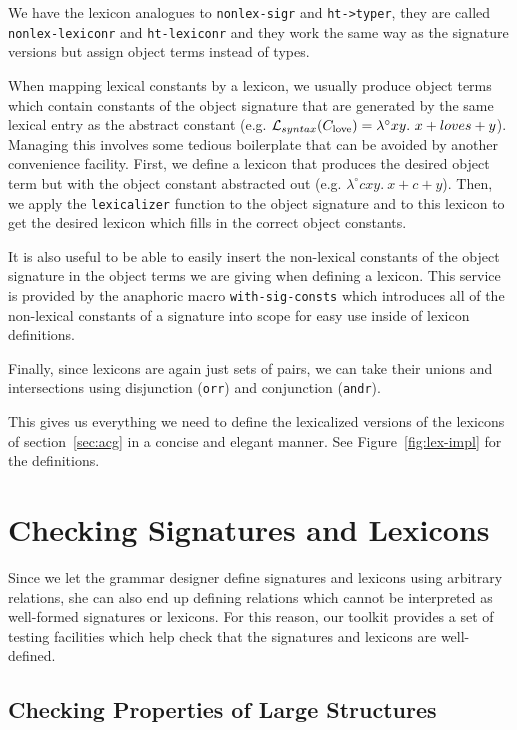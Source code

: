 We have the lexicon analogues to \texttt{nonlex-sigr} and
\texttt{ht->typer}, they are called \texttt{nonlex-lexiconr} and
\texttt{ht-lexiconr} and they work the same way as the signature
versions but assign object terms instead of types.

When mapping lexical constants by a lexicon, we usually produce object
terms which contain constants of the object signature that are generated
by the same lexical entry as the abstract constant
(e.g. $\mathcal{L}_{syntax}(C_{\textrm{love}}) = \lambda^{\circ} x y.\ x +
loves + y$). Managing this involves some tedious boilerplate that can be
avoided by another convenience facility. First, we define a lexicon that
produces the desired object term but with the object constant abstracted
out (e.g. $\lambda^{\circ} c x y.\ x + c + y$). Then, we apply the
\texttt{lexicalizer} function to the object signature and to this
lexicon to get the desired lexicon which fills in the correct object
constants.

It is also useful to be able to easily insert the non-lexical constants
of the object signature in the object terms we are giving when defining
a lexicon. This service is provided by the anaphoric macro
\texttt{with-sig-consts} which introduces all of the non-lexical
constants of a signature into scope for easy use inside of lexicon
definitions.

Finally, since lexicons are again just sets of pairs, we can take their
unions and intersections using disjunction (\texttt{orr}) and
conjunction (\texttt{andr}).

This gives us everything we need to define the lexicalized versions of
the lexicons of section~\ref{sec:acg} in a concise and elegant
manner. See Figure~\ref{fig:lex-impl} for the definitions.


\section{Checking Signatures and Lexicons}

Since we let the grammar designer define signatures and lexicons using
arbitrary relations, she can also end up defining relations which cannot
be interpreted as well-formed signatures or lexicons. For this reason,
our toolkit provides a set of testing facilities which help check that
the signatures and lexicons are well-defined.

\subsection{Checking Properties of Large Structures}

